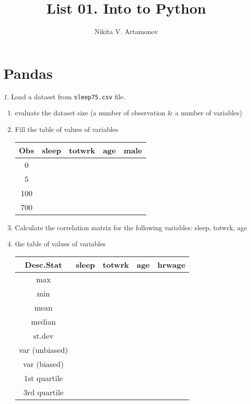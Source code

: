 \documentclass[12pt]{article}
\title{List 01. Into to Python}
\author{Nikita V. Artamonov}
\theoremstyle{remark}
\newtheorem{problem}{}[section]
\begin{document}
\maketitle

\tableofcontents

\section{Pandas}

\begin{problem}
Load a dataset from \texttt{sleep75.csv} file.
\begin{enumerate}
	\item evaluate the dataset size (a number of observation \& a number of variables)
	\item Fill the table of values of variables
	\begin{center}
		\begin{tabular}{|c|c|c|c|c|} \hline
			Obs & sleep & totwrk & age & male\\ \hline\hline
			0 & & & & \\ \hline
			5 & & & & \\ \hline
			100 & & & & \\ \hline
			700 & & & & \\ \hline
		\end{tabular}
	\end{center}
	\item Calculate the correlation matrix for the following
	variables: sleep, totwrk, age 
	\item the table of values of variables
	\begin{center}
		\begin{tabular}{|c|c|c|c|c|} \hline
			Desc.Stat & sleep & totwrk & age & hrwage\\ \hline\hline
			max & & & & \\ \hline
			min & & & & \\ \hline
			mean & & & & \\ \hline
			median & & & & \\ \hline
			st.dev & & & & \\ \hline
			var (unbiased) & & & & \\ \hline
			var (biased) & & & & \\ \hline
			1st quartile & & & & \\ \hline
			3rd quartile & & & & \\ \hline
		\end{tabular}
	\end{center}

\end{enumerate}
\end{problem}
\end{document}
